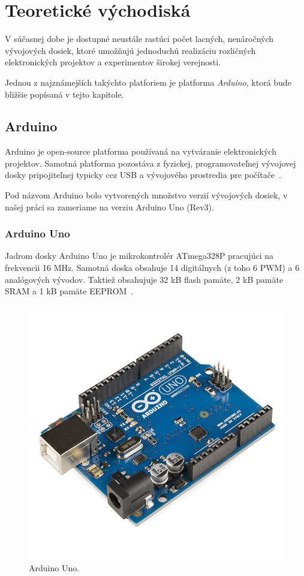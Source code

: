 \chapter{Teoretické východiská}
V súčasnej dobe je dostupné neustále rastúci počet lacných, nenáročných vývojových dosiek, ktoré umožňujú jednoduchú realizáciu rozličných elektronických projektov a experimentov širokej verejnosti.

Jednou z najznámejších takýchto platforiem je platforma \emph{Arduino}, ktorá bude bližšie popísaná v tejto kapitole.

\section{Arduino}
Arduino je open-source platforma používaná na vytváranie elektronických projektov. Samotná platforma pozostáva z fyzickej, programovateľnej vývojovej dosky pripojiteľnej typicky cez USB a vývojového prostredia pre počítače~\cite{maly-hvj}.

Pod názvom Arduino bolo vytvorených množstvo verzií vývojových dosiek, v našej práci sa zameriame na verziu Arduino Uno (Rev3).

\subsection{Arduino Uno}
Jadrom dosky Arduino Uno je mikrokontrolér ATmega328P pracujúci na frekvencii 16 MHz. Samotná doska obsahuje 14 digitálnych (z toho 6 PWM) a 6 analógových vývodov. Taktiež obsahujuje 32 kB flash pamäte, 2 kB pamäte SRAM a 1 kB pamäte EEPROM~\cite{arduino-uno}.

\begin{figure}
    \centering
    \includegraphics{img/Arduino_Uno.jpg}
    \caption{Arduino Uno.}
\end{figure}

